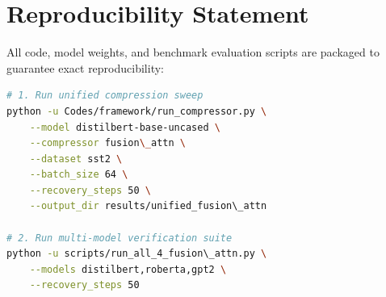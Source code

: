 \section{Reproducibility Statement}
All code, model weights, and benchmark evaluation scripts are packaged to guarantee exact reproducibility:
\begin{lstlisting}[language=bash]
# 1. Run unified compression sweep
python -u Codes/framework/run_compressor.py \
    --model distilbert-base-uncased \
    --compressor fusion\_attn \
    --dataset sst2 \
    --batch_size 64 \
    --recovery_steps 50 \
    --output_dir results/unified_fusion\_attn

# 2. Run multi-model verification suite
python -u scripts/run_all_4_fusion\_attn.py \
    --models distilbert,roberta,gpt2 \
    --recovery_steps 50
\end{lstlisting}

